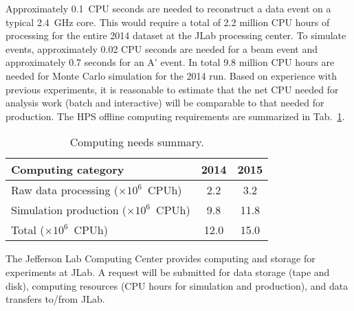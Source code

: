 Approximately 0.1~CPU seconds are needed to reconstruct a data event on 
a typical 2.4~GHz core. This would require a total of 2.2 million CPU hours of processing for the 
entire 2014 dataset at the JLab processing center.  To simulate events, approximately 0.02 CPU seconds 
are needed for a beam event and approximately 0.7 seconds for an A' event. In total 9.8 million CPU hours are needed for Monte Carlo 
simulation for the 2014 run. 
Based on experience with previous experiments, it is reasonable to estimate that the net CPU needed for 
analysis work (batch and interactive) will be comparable to that needed for production. 
The HPS offline computing requirements 
are summarized in Tab.~\ref{tab:computing}.
\begin{table}[tbp]
\centering
\begin{tabular}{|l|c|c|}
\hline
Computing category & 2014& 2015 \\
\hline
Raw data processing ($\times 10^{6}$~CPUh)  & 2.2 & 3.2 \\
Simulation production ($\times 10^{6}$~CPUh) & 9.8 & 11.8 \\
\hline
Total ($\times 10^{6}$~CPUh) & 12.0 & 15.0 \\
\hline
\end{tabular}
\caption{{\small Computing needs summary.}}
\label{tab:computing}
\end{table}

The Jefferson Lab Computing Center provides computing and storage for experiments at JLab. 
A request will be submitted for data storage (tape and disk), computing resources (CPU hours for simulation and production), and data transfers to/from JLab.
